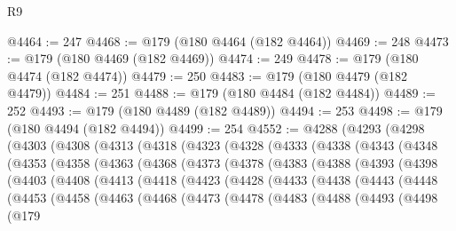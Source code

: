 \begin{lexlean}{R9}
\begin{coremodule}
@4464 := 247
@4468 := @179 (@180 @4464 (@182 @4464))
@4469 := 248
@4473 := @179 (@180 @4469 (@182 @4469))
@4474 := 249
@4478 := @179 (@180 @4474 (@182 @4474))
@4479 := 250
@4483 := @179 (@180 @4479 (@182 @4479))
@4484 := 251
@4488 := @179 (@180 @4484 (@182 @4484))
@4489 := 252
@4493 := @179 (@180 @4489 (@182 @4489))
@4494 := 253
@4498 := @179 (@180 @4494 (@182 @4494))
@4499 := 254
@4552 := @4288
    (@4293
      (@4298
        (@4303
          (@4308
            (@4313
              (@4318
                (@4323
                  (@4328
                    (@4333
                      (@4338
                        (@4343
                          (@4348
                            (@4353
                              (@4358
                                (@4363
                                  (@4368
                                    (@4373
                                      (@4378
                                        (@4383
                                          (@4388
                                            (@4393
                                              (@4398
                                                (@4403
                                                  (@4408
                                                    (@4413
                                                      (@4418
                                                        (@4423
                                                          (@4428
                                                            (@4433
                                                              (@4438
                                                                (@4443
                                                                  (@4448
                                                                    (@4453
                                                                      (@4458
                                                                        (@4463
                                                                          (@4468
                                                                            (@4473
                                                                              (@4478
                                                                                (@4483
                                                                                  (@4488
                                                                                    (@4493
                                                                                      (@4498
                                                                                        (@179

\end{coremodule}
\end{lexlean}
